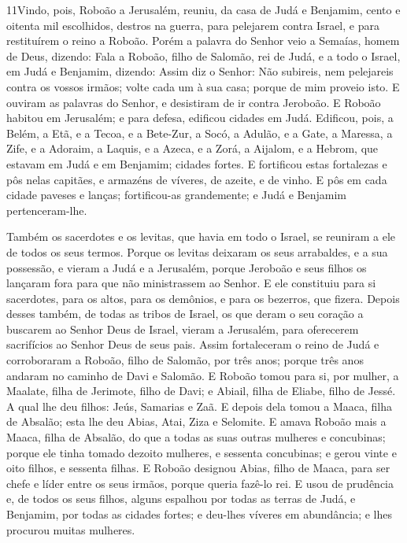 \medskip

\lettrine{11} Vindo, pois, Roboão a Jerusalém, reuniu, da casa
de Judá e Benjamim, cento e oitenta mil escolhidos, destros na
guerra, para pelejarem contra Israel, e para restituírem o reino a
Roboão. Porém a palavra do Senhor veio a Semaías, homem de Deus,
dizendo: Fala a Roboão, filho de Salomão, rei de Judá, e a todo
o Israel, em Judá e Benjamim, dizendo: Assim diz o Senhor: Não
subireis, nem pelejareis contra os vossos irmãos; volte cada um à
sua casa; porque de mim proveio isto. E ouviram as palavras do
Senhor, e desistiram de ir contra Jeroboão. E Roboão habitou em
Jerusalém; e para defesa, edificou cidades em Judá. Edificou,
pois, a Belém, a Etã, e a Tecoa, e a Bete-Zur, a Socó, a Adulão,
e a Gate, a Maressa, a Zife, e a Adoraim, a Laquis, e a
Azeca, e a Zorá, a Aijalom, e a Hebrom, que estavam em Judá e
em Benjamim; cidades fortes. E fortificou estas fortalezas e
pôs nelas capitães, e armazéns de víveres, de azeite, e de vinho.
E pôs em cada cidade paveses e lanças; fortificou-as
grandemente; e Judá e Benjamim pertenceram-lhe.

Também os sacerdotes e os levitas, que havia em todo o Israel, se
reuniram a ele de todos os seus termos. Porque os levitas
deixaram os seus arrabaldes, e a sua possessão, e vieram a Judá e a
Jerusalém, porque Jeroboão e seus filhos os lançaram fora para que
não ministrassem ao Senhor. E ele constituiu para si
sacerdotes, para os altos, para os demônios, e para os bezerros, que
fizera. Depois desses também, de todas as tribos de Israel,
os que deram o seu coração a buscarem ao Senhor Deus de Israel,
vieram a Jerusalém, para oferecerem sacrifícios ao Senhor Deus de
seus pais. Assim fortaleceram o reino de Judá e corroboraram
a Roboão, filho de Salomão, por três anos; porque três anos andaram
no caminho de Davi e Salomão. E Roboão tomou para si, por
mulher, a Maalate, filha de Jerimote, filho de Davi; e Abiail, filha
de Eliabe, filho de Jessé. A qual lhe deu filhos: Jeús,
Samarias e Zaã. E depois dela tomou a Maaca, filha de
Absalão; esta lhe deu Abias, Atai, Ziza e Selomite. E amava
Roboão mais a Maaca, filha de Absalão, do que a todas as suas outras
mulheres e concubinas; porque ele tinha tomado dezoito mulheres, e
sessenta concubinas; e gerou vinte e oito filhos, e sessenta filhas.
E Roboão designou Abias, filho de Maaca, para ser chefe e
líder entre os seus irmãos, porque queria fazê-lo rei. E usou
de prudência e, de todos os seus filhos, alguns espalhou por todas
as terras de Judá, e Benjamim, por todas as cidades fortes; e
deu-lhes víveres em abundância; e lhes procurou muitas mulheres.

